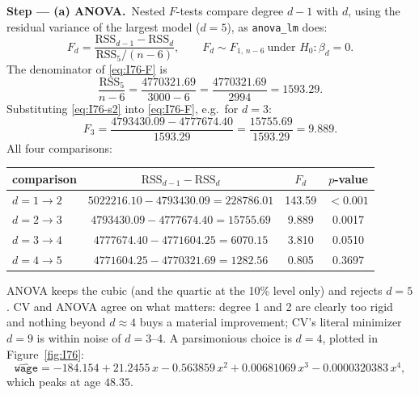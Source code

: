 \documentclass[11pt,a4paper]{article}
\numberwithin{equation}{questao}   %
\newcommand{\passo}[2]{\par\smallskip\noindent\textbf{Step --- #1.}~#2}
\begin{document}
\begin{sol}
\passo{(a) ANOVA}{Nested $F$-tests compare degree $d-1$ with $d$, using the residual variance of
the largest model ($d=5$), as \texttt{anova\_lm} does:
\begin{equation}\label{eq:I76-F}
F_d=\frac{\mathrm{RSS}_{d-1}-\mathrm{RSS}_d}{\mathrm{RSS}_5/(n-6)},\qquad F_d\sim F_{1,\,n-6}\ \text{under } H_0:\beta_d=0 .
\end{equation}
The denominator of \eqref{eq:I76-F} is
\begin{equation}\label{eq:I76-s2}
\frac{\mathrm{RSS}_5}{n-6}=\frac{4770321.69}{3000-6}=\frac{4770321.69}{2994}=1593.29 .
\end{equation}
Substituting \eqref{eq:I76-s2} into \eqref{eq:I76-F}, e.g.\ for $d=3$:
\begin{equation}\label{eq:I76-F3}
F_3=\frac{4793430.09-4777674.40}{1593.29}=\frac{15755.69}{1593.29}=9.889 .
\end{equation}
All four comparisons:
\begin{center}\small\begin{tabular}{lccc}\toprule
comparison & $\mathrm{RSS}_{d-1}-\mathrm{RSS}_d$ & $F_d$ & $p$-value\\\midrule
$d=1\to2$ & $5022216.10-4793430.09=228786.01$ & 143.59 & $<0.001$\\
$d=2\to3$ & $4793430.09-4777674.40=15755.69$ & 9.889 & 0.0017\\
$d=3\to4$ & $4777674.40-4771604.25=6070.15$ & 3.810 & 0.0510\\
$d=4\to5$ & $4771604.25-4770321.69=1282.56$ & 0.805 & 0.3697\\\bottomrule\end{tabular}\end{center}
ANOVA keeps the cubic (and the quartic at the 10\% level only) and rejects $d=5$. CV and ANOVA
agree on what matters: degree 1 and 2 are clearly too rigid and nothing beyond $d\approx 4$ buys
a material improvement; CV's literal minimizer $d=9$ is within noise of $d=3$--4. A
parsimonious choice is $d=4$, plotted in Figure~\ref{fig:I76}:
\begin{equation}\label{eq:I76-fit4}
\widehat{\texttt{wage}}=-184.154+21.2455\,x-0.563859\,x^2+0.00681069\,x^3-0.0000320383\,x^4,
\end{equation}
which peaks at age $48.35$.}


\end{sol}
\end{document}
